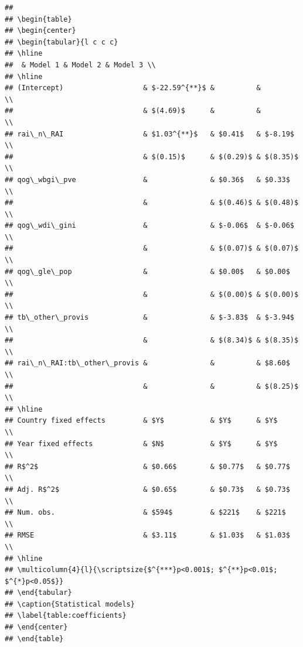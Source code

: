 \documentclass[
]{article}
\begin{document}
\begin{verbatim}
## 
## \begin{table}
## \begin{center}
## \begin{tabular}{l c c c}
## \hline
##  & Model 1 & Model 2 & Model 3 \\
## \hline
## (Intercept)                   & $-22.59^{**}$ &          &          \\
##                               & $(4.69)$      &          &          \\
## rai\_n\_RAI                   & $1.03^{**}$   & $0.41$   & $-8.19$  \\
##                               & $(0.15)$      & $(0.29)$ & $(8.35)$ \\
## qog\_wbgi\_pve                &               & $0.36$   & $0.33$   \\
##                               &               & $(0.46)$ & $(0.48)$ \\
## qog\_wdi\_gini                &               & $-0.06$  & $-0.06$  \\
##                               &               & $(0.07)$ & $(0.07)$ \\
## qog\_gle\_pop                 &               & $0.00$   & $0.00$   \\
##                               &               & $(0.00)$ & $(0.00)$ \\
## tb\_other\_provis             &               & $-3.83$  & $-3.94$  \\
##                               &               & $(8.34)$ & $(8.35)$ \\
## rai\_n\_RAI:tb\_other\_provis &               &          & $8.60$   \\
##                               &               &          & $(8.25)$ \\
## \hline
## Country fixed effects         & $Y$           & $Y$      & $Y$      \\
## Year fixed effects            & $N$           & $Y$      & $Y$      \\
## R$^2$                         & $0.66$        & $0.77$   & $0.77$   \\
## Adj. R$^2$                    & $0.65$        & $0.73$   & $0.73$   \\
## Num. obs.                     & $594$         & $221$    & $221$    \\
## RMSE                          & $3.11$        & $1.03$   & $1.03$   \\
## \hline
## \multicolumn{4}{l}{\scriptsize{$^{***}p<0.001$; $^{**}p<0.01$; $^{*}p<0.05$}}
## \end{tabular}
## \caption{Statistical models}
## \label{table:coefficients}
## \end{center}
## \end{table}
\end{verbatim}
\end{document}
